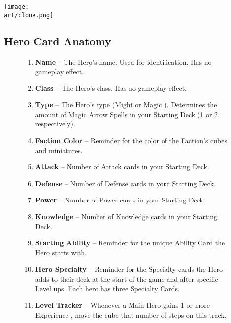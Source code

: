 \begin{multicols*}{2}
\vfill

\hspace{2em}
\texttt{[image: \\art/clone.png]}

\end{multicols*}

\clearpage

\subsection*{\hypertarget{Herocard}{Hero Card Anatomy}}
\bigbreak
\begin{figure}[h]
  \begin{minipage}[t]{0.5\textwidth}
    \vspace{0pt}
    \begin{enumerate}[itemsep=5pt]
      \item \textbf{Name} – The Hero's name.
        Used for identification.
        Has no gameplay effect.
      \item \textbf{Class} – The Hero's class.
        Has no gameplay effect.
      \item \textbf{Type} – The Hero's type (Might  or Magic ).
        Determines the amount of Magic Arrow Spells in your Starting Deck (1 or 2 respectively).
      \item \textbf{Faction Color} – Reminder for the color of the Faction's cubes and miniatures.
      \item \textbf{Attack} – Number of Attack cards in your Starting Deck.
      \item \textbf{Defense} – Number of Defense cards in your Starting Deck.
      \item \textbf{Power} – Number of Power cards in your Starting Deck.
      \item \textbf{Knowledge} – Number of Knowledge cards in your Starting Deck.
      \item \textbf{Starting Ability} – Reminder for the unique Ability Card the Hero starts with.
      \item \textbf{Hero Specialty} – Reminder for the Specialty cards the Hero adds to their deck at the start of the game and after specific Level ups.
        Each hero has three Specialty Cards.
      \item \textbf{Level Tracker} – Whenever a Main Hero gains 1 or more Experience , move the cube that number of steps on this track.

\end{enumerate}
\end{minipage}
\end{figure}
